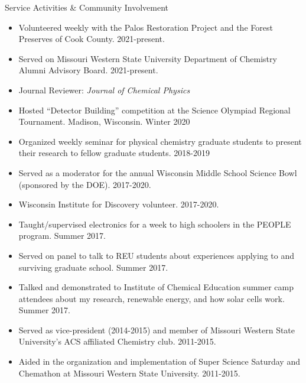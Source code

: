 \documentclass{resume} %
\begin{document}

\begin{rSection}{Service Activities \& Community Involvement}

\begin{itemize}[leftmargin = 0 pt]
	\item Volunteered weekly with the Palos Restoration Project and the Forest Preserves of Cook County. 2021-present.
	\item Served on Missouri Western State University Department of Chemistry Alumni Advisory Board. 2021-present. 
	\item Journal Reviewer: \emph{Journal of Chemical Physics}
	\item Hosted ``Detector Building'' competition at the Science Olympiad Regional Tournament. Madison, Wisconsin. Winter 2020
	\item Organized weekly seminar for physical chemistry graduate students to present their research to fellow graduate students. 2018-2019
	\item Served as a moderator for the annual Wisconsin Middle School Science Bowl (sponsored by the DOE). 2017-2020.
	\item Wisconsin Institute for Discovery volunteer. 2017-2020. 
	\item Taught/supervised electronics for a week to high schoolers in the PEOPLE program. Summer 2017.
	\item Served on panel to talk to REU students about experiences applying to and surviving graduate school. Summer 2017.
	\item Talked and demonstrated to Institute of Chemical Education summer camp attendees about my research, renewable energy, and how solar cells work. Summer 2017.  
	\item Served as vice-president (2014-2015) and member of Missouri Western State University's ACS affiliated Chemistry club. 2011-2015.
	\item Aided in the organization and implementation of Super Science Saturday and Chemathon at Missouri Western State University. 2011-2015.	
\end{itemize}

\end{rSection}
\end{document}
